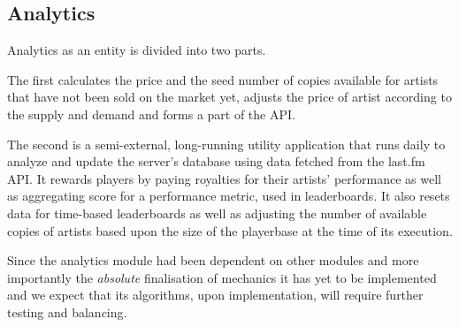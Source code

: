 \documentclass[a4paper,10pt,twoside]{article}
\begin{document}
\subsection{Analytics}
Analytics as an entity is divided into two parts.

The first calculates the price and the seed number of copies available for artists that have not been sold on the market yet, adjusts the price of artist according to the supply and demand and forms a part of the API.

The second is a semi-external, long-running utility application that runs daily to analyze and update the server's database using data fetched from the last.fm API. It rewards players by paying royalties for their artists' performance as well as aggregating score for a performance metric, used in leaderboards. It also resets data for time-based leaderboards as well as adjusting the number of available copies of artists based upon the size of the playerbase at the time of its execution.

Since the analytics module had been dependent on other modules and more importantly the \emph{absolute} finalisation of mechanics it has yet to be implemented and we expect that its algorithms, upon implementation, will require further testing and balancing.
\end{document}
